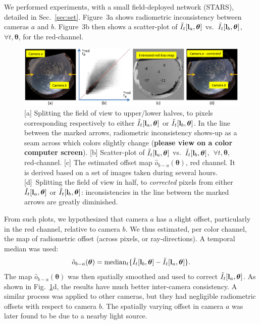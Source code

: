 \documentclass[runningheads]{llncs}
\begin{document}
We performed experiments, with a small field-deployed network (STARS), detailed in Sec.~\ref{sec:set}. Figure~3a shows radiometric inconsistency between cameras $a$ and $b$. Figure~3b then shows a scatter-plot of
$\tilde I_t[{\bf l}_a,{\bm \theta}]$ vs.~$\tilde I_t[{\bf l}_{b},{\bm \theta}]$, $\forall t,{\bm \theta}$, for the red-channel.
\begin{figure}[t!]
\begin{center}
   \includegraphics[width=\linewidth]{figures/bias4.eps}
\end{center}
   \vspace{-0.6cm}
   \caption{[a] Splitting the field of view to upper/lower halves, to pixels corresponding
   respectively to either $\tilde I_t[{\bf l}_a,{\bm \theta}]$  or $\tilde I_t[{\bf l}_{b},{\bm \theta}]$. In the line between the marked arrows, radiometric inconsistency shows-up as a seam across which colors slightly change ({\bf please view on a color computer screen}). [b] Scatter-plot of
   $\tilde I_t[{\bf l}_a,{\bm \theta}]$ vs.~$\tilde I_t[{\bf l}_{b},{\bm \theta}]$, $~\forall t,{\bm \theta}$, red-channel. [c] The estimated offset map ${\hat o}_{b-a}({\bm \theta})$, red channel. It is derived based on a set of images taken during several hours.
   [d]~Splitting the field of view in half, to {\em corrected} pixels from either
   $\hat I_t[{\bf l}_a,{\bm \theta}]$  or $\hat I_t[{\bf l}_{b},{\bm \theta}]$: inconsistencies in the line between the marked arrows are greatly
   diminished.
   }
\label{fig:calibration}
\end{figure}
From such plots, we hypothesized that camera $a$ has a slight offset, particularly in the red channel, relative to camera $b$. We thus estimated, per color channel, the map of radiometric offset (across pixels, or ray-directions). A temporal median was used:
\begin{equation}
 {\hat o}_{b-a}({\bm \theta})=
  {\rm median}_{t} \{\tilde I_t[{\bf l}_b,{\bm \theta}]-\tilde I_t[{\bf l}_a,{\bm \theta}]\}.
 \label{eq:hato}
\end{equation}
The map ${\hat o}_{b-a}({\bm \theta})$ was then spatially smoothed and used to correct $\tilde I_t[{\bf l}_a,{\bm \theta}]$. As shown in Fig.~\ref{fig:calibration}d, the results have much better inter-camera consistency. A similar process was applied to other cameras, but they had negligible radiometric offsets with respect to camera $b$. The spatially varying offset in camera $a$ was later found to be due to a nearby light source.
\end{document}
